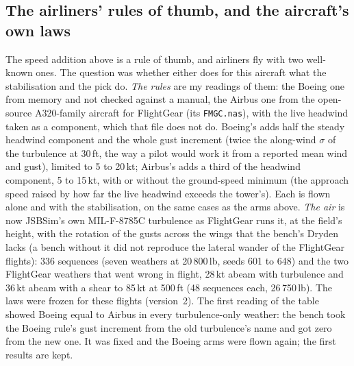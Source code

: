 \documentclass[10pt,a4paper,twocolumn]{article}
\begin{document}
\subsection{The airliners' rules of thumb, and the aircraft's own laws}\label{sec:rules}
The speed addition above is a rule of thumb, and airliners fly with two well-known ones. The question was whether either does for this aircraft what the stabilisation and the pick do.
\emph{The rules} are my readings of them: the Boeing one from memory and not checked against a manual, the Airbus one from the open-source A320-family aircraft for FlightGear (its \texttt{FMGC.nas}),
with the live headwind taken as a component, which that file does not do. Boeing's adds half the steady headwind component and the whole gust increment (twice the along-wind $\sigma$ of the turbulence at 30\,ft, the way a pilot
would work it from a reported mean wind and gust), limited to 5 to 20\,kt; Airbus's adds a third of the headwind component, 5 to 15\,kt, with or without the ground-speed minimum (the approach speed raised by how far
the live headwind exceeds the tower's). Each is flown alone and with the stabilisation, on the same cases as the arms above. \emph{The air} is now JSBSim's own MIL-F-8785C turbulence as FlightGear runs it, at the field's height,
with the rotation of the gusts across the wings that the bench's Dryden lacks (a bench without it did not reproduce the lateral wander of the FlightGear flights): 336 sequences (seven weathers at 20\,800\,lb, seeds 601 to 648) and
the two FlightGear weathers that went wrong in flight, 28\,kt abeam with turbulence and 36\,kt abeam with a shear to 85\,kt at 500\,ft (48 sequences each, 26\,750\,lb). The laws were frozen for these flights (version~2).
The first reading of the table showed Boeing equal to Airbus in every turbulence-only weather: the bench took the Boeing rule's gust increment from the old turbulence's name and got zero from the new one. It was fixed
and the Boeing arms were flown again; the first results are kept.

\begin{table}[t]\centering\footnotesize

\caption{The airliners' rules against the aircraft's own laws (the pick and the stabilisation), in JSBSim's own turbulence. Hard: sink over 2\,m/s, the structural flag or no touchdown; events: flights in which the angle-of-attack
protection acted below 500\,ft (the margin under its limit below 0); line: the distance off the centreline at the first wheel (95th percentile); landing: the distance from the aiming point to the end of the rollout (mean).}\label{tab:rules}
\end{table}
\begin{table}[t]\centering\footnotesize
\resizebox{\textwidth}{!}{}
\caption{The contrasts that carry the argument, paired by case; columns as table~\ref{tab:gustc}. Differences are the first arm less the second, means with 95\,\% bootstrap intervals.}\label{tab:rulesc}
\end{table}
\end{document}
